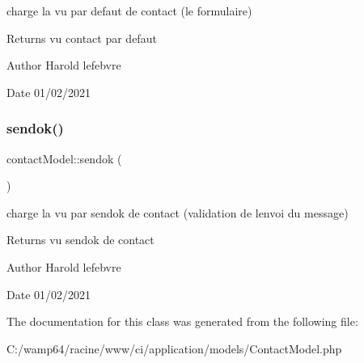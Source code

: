 charge la vu par defaut de contact (le formulaire) 

\begin{DoxyReturn}{Returns}
vu contact par defaut 
\end{DoxyReturn}
\begin{DoxyAuthor}{Author}
Harold lefebvre 
\end{DoxyAuthor}
\begin{DoxyDate}{Date}
01/02/2021 
\end{DoxyDate}
\mbox{\label{classcontact_model_ab9e3c7e7068a12731b2c07f032eab736}} 
\subsubsection{\texorpdfstring{sendok()}{sendok()}}
{\footnotesize\ttfamily contact\+Model\+::sendok (\begin{DoxyParamCaption}{ }\end{DoxyParamCaption})}



charge la vu par sendok de contact (validation de l\textquotesingle{}envoi du message) 

\begin{DoxyReturn}{Returns}
vu sendok de contact 
\end{DoxyReturn}
\begin{DoxyAuthor}{Author}
Harold lefebvre 
\end{DoxyAuthor}
\begin{DoxyDate}{Date}
01/02/2021 
\end{DoxyDate}


The documentation for this class was generated from the following file\+:\begin{DoxyCompactItemize}
\item 
C\+:/wamp64/racine/www/ci/application/models/Contact\+Model.\+php\end{DoxyCompactItemize}
